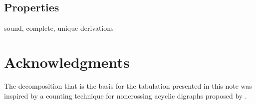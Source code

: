 \documentclass[a4paper]{article}
\begin{document}
\subsection{Properties}

sound, complete, unique derivations


\section*{Acknowledgments}

The decomposition that is the basis for the tabulation presented in this note was inspired by a counting technique for noncrossing acyclic digraphs proposed by \citet{tirrell2014number}.




\end{document}
